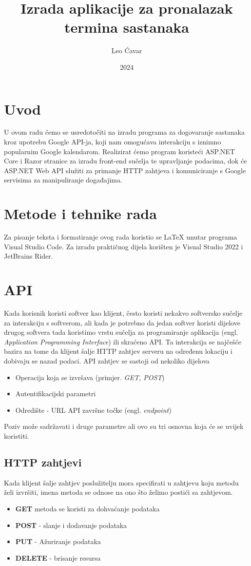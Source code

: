 \documentclass{foi}
\title{Izrada aplikacije za pronalazak termina sastanaka}
\author{Leo Ćavar}
\date{2024}
\begin{document}
\maketitle

\tableofcontents

\pagestyle{plain}
\chapter{Uvod}
U ovom radu ćemo se usredotočiti na izradu programa za dogovaranje sastanaka kroz upotrebu Google API-ja, koji nam omogućava interakciju s iznimno popularnim Google kalendarom. Realizirat ćemo program koristeći ASP.NET Core i Razor stranice za izradu front-end sučelja te upravljanje podacima, dok će ASP.NET Web API služiti za primanje HTTP zahtjeva i komuniciranje s Google servisima za manipuliranje događajima.

\chapter{Metode i tehnike rada}
Za pisanje teksta i formatiranje ovog rada koristio se LaTeX unutar programa Visual Studio Code. Za izradu praktičnog dijela korišten je Visual Studio 2022 i JetBrains Rider.

\chapter{API}
Kada korisnik koristi softver kao klijent, često koristi nekakvo softversko sučelje za interakciju s softverom, ali kada je potrebno da jedan softver koristi dijelove drugog softvera tada koristimo vrstu sučelja za programiranje aplikacija (engl. \textit{Application Programming Interface}) ili skraćeno API.\cite{biehl2015api}
Ta interakcija se najčešće bazira na tome da klijent šalje HTTP zahtjev serveru na određenu lokaciju i dobivaju se nazad podaci.
API zahtjev se sastoji od nekoliko dijelova \cite{altexsoft}
\begin{itemize}
    \item Operacija koja se izvršava (primjer. \textit{GET, POST})
    \item Autentifikacijski parametri
    \item Odredište - URL API završne točke (engl. \textit{endpoint})
\end{itemize}
Poziv može sadržavati i druge parametre ali ovo su tri osnovna koja će se uvijek koristiti.
\section{HTTP zahtjevi}
Kada klijent šalje zahtjev poslužitelju mora specifirati u zahtjevu koju metodu želi izvršiti, imena metoda se odnose na ono što želimo postići sa zahtjevom. \cite{Maurya2021} 
\begin{itemize}
    \item \textbf{GET} metoda se koristi za dohvaćanje podataka
    \item \textbf{POST} - slanje i dodavanje podataka
    \item \textbf{PUT} - Ažuriranje podataka
    \item \textbf{DELETE} - brisanje resursa 
\end{itemize}
\end{document}
